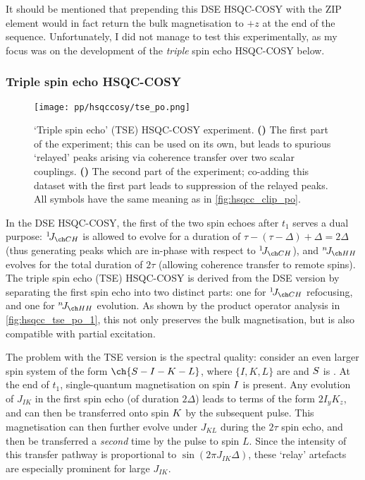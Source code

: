 It should be mentioned that prepending this DSE HSQC-COSY with the ZIP element would in fact return the bulk  magnetisation to $+z$ at the end of the sequence.
Unfortunately, I did not manage to test this experimentally, as my focus was on the development of the \textit{triple} spin echo HSQC-COSY below.


\subsubsection{Triple spin echo HSQC-COSY}

\begin{figure}[!ht]
    \centering
    \texttt{[image: pp/hsqccosy/tse\_po.png]}%
    {\label{fig:hsqcc_tse_po_1}}%
    {\label{fig:hsqcc_tse_po_2}}%
    \caption[Triple spin echo HSQC-COSY experiment]{
        `Triple spin echo' (TSE) HSQC-COSY experiment.
        \textbf{()} The first part of the experiment; this can be used on its own, but leads to spurious `relayed' peaks arising via coherence transfer over two scalar couplings.
        \textbf{()} The second part of the experiment; co-adding this dataset with the first part leads to suppression of the relayed peaks.
        All symbols have the same meaning as in \cref{fig:hsqcc_clip_po}.
    }
    \label{fig:hsqcc_tse_po}
\end{figure}

In the DSE HSQC-COSY, the first of the two spin echoes after $t_1$ serves a dual purpose: $\oneJ{CH}$ is allowed to evolve for a duration of $\tau - (\tau - \Delta) + \Delta = 2\Delta$ (thus generating peaks which are in-phase with respect to $\oneJ{CH}$), and $\nJ{HH}$ evolves for the total duration of $2\tau$ (allowing coherence transfer to remote spins).
The triple spin echo (TSE) HSQC-COSY is derived from the DSE version by separating the first spin echo into two distinct parts: one for $\oneJ{CH}$ refocusing, and one for $\nJ{HH}$ evolution.
As shown by the product operator analysis in \cref{fig:hsqcc_tse_po_1}, this not only preserves the bulk  magnetisation, but is also compatible with partial  excitation.

The problem with the TSE version is the spectral quality: consider an even larger spin system of the form $\ch{S-I-K-L}$, where $\{I,K,L\}$ are \proton{} and $S\/$ is \carbon{}.
At the end of $t_1$, single-quantum magnetisation on spin $I\/$ is present.
Any evolution of $J_{IK}$ in the first spin echo (of duration $2\Delta$) leads to terms of the form $2I_yK_z$, and can then be transferred onto spin $K\/$ by the subsequent  pulse.
This magnetisation can then further evolve under $J_{KL}$ during the $2\tau$ spin echo, and then be transferred a \textit{second} time by the  pulse to spin $L$.
Since the intensity of this transfer pathway is proportional to $\sin(2\pi J_{IK}\Delta)$, these `relay' artefacts are especially prominent for large $J_{IK}$.

